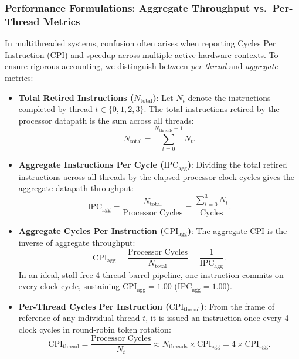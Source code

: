 \subsubsection{Performance Formulations: Aggregate Throughput vs.\ Per-Thread Metrics}
In multithreaded systems, confusion often arises when reporting Cycles Per Instruction (CPI) and speedup across multiple active hardware contexts. To ensure rigorous accounting, we distinguish between \textit{per-thread} and \textit{aggregate} metrics:
\begin{itemize}
    \item \textbf{Total Retired Instructions ($N_{\text{total}}$)}:
    Let $N_t$ denote the instructions completed by thread $t \in \{0, 1, 2, 3\}$. The total instructions retired by the processor datapath is the sum across all threads:
    \begin{equation}
    N_{\text{total}} = \sum_{t=0}^{N_{\text{threads}}-1} N_t.
    \end{equation}
    \item \textbf{Aggregate Instructions Per Cycle ($\text{IPC}_{\text{agg}}$)}:
    Dividing the total retired instructions across all threads by the elapsed processor clock cycles gives the aggregate datapath throughput:
    \begin{equation}
    \text{IPC}_{\text{agg}} = \frac{N_{\text{total}}}{\text{Processor Cycles}} = \frac{\sum_{t=0}^3 N_t}{\text{Cycles}}.
    \end{equation}
    \item \textbf{Aggregate Cycles Per Instruction ($\text{CPI}_{\text{agg}}$)}:
    The aggregate CPI is the inverse of aggregate throughput:
    \begin{equation}
    \text{CPI}_{\text{agg}} = \frac{\text{Processor Cycles}}{N_{\text{total}}} = \frac{1}{\text{IPC}_{\text{agg}}}.
    \end{equation}
    In an ideal, stall-free 4-thread barrel pipeline, one instruction commits on every clock cycle, sustaining $\text{CPI}_{\text{agg}} = 1.00$ ($\text{IPC}_{\text{agg}} = 1.00$).
    \item \textbf{Per-Thread Cycles Per Instruction ($\text{CPI}_{\text{thread}}$)}:
    From the frame of reference of any individual thread $t$, it is issued an instruction once every 4 clock cycles in round-robin token rotation:
    \begin{equation}
    \text{CPI}_{\text{thread}} = \frac{\text{Processor Cycles}}{N_t} \approx N_{\text{threads}} \times \text{CPI}_{\text{agg}} = 4 \times \text{CPI}_{\text{agg}}.

\end{equation}
\end{itemize}
